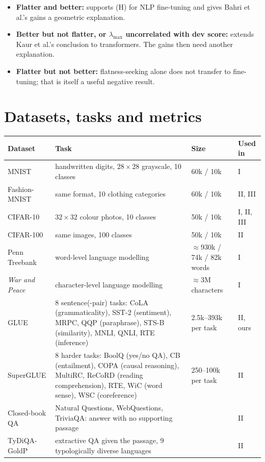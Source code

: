 \documentclass[11pt]{article}
\newcommand{\lmax}{\lambda_{\max}}
\theoremstyle{plain}
\begin{document}
\begin{itemize}
  \item \textbf{Flatter and better:} supports (H) for NLP fine-tuning and gives Bahri et al.'s gains a geometric explanation.
  \item \textbf{Better but not flatter, or $\lmax$ uncorrelated with dev score:} extends Kaur et al.'s conclusion to transformers. The gains then need another explanation.
  \item \textbf{Flatter but not better:} flatness-seeking alone does not transfer to fine-tuning; that is itself a useful negative result.
\end{itemize}

\appendix
\section{Datasets, tasks and metrics}
\label{app:data}

\begin{longtable}{@{}p{2.8cm}p{6.4cm}p{3.0cm}p{2.0cm}@{}}
\toprule
\textbf{Dataset} & \textbf{Task} & \textbf{Size} & \textbf{Used in} \\
\midrule
\endhead
MNIST & handwritten digits, $28{\times}28$ grayscale, 10 classes & 60k / 10k & I \\
Fashion-MNIST & same format, 10 clothing categories & 60k / 10k & II, III \\
CIFAR-10 & $32{\times}32$ colour photos, 10 classes & 50k / 10k & I, II, III \\
CIFAR-100 & same images, 100 classes & 50k / 10k & II \\
Penn Treebank & word-level language modelling & $\approx$930k / 74k / 82k words & I \\
\emph{War and Peace} & character-level language modelling & $\approx$3M characters & I \\
GLUE & 8 sentence(-pair) tasks: CoLA (grammaticality), SST-2 (sentiment), MRPC, QQP (paraphrase), STS-B (similarity), MNLI, QNLI, RTE (inference) & 2.5k--393k per task & II, ours \\
SuperGLUE & 8 harder tasks: BoolQ (yes/no QA), CB (entailment), COPA (causal reasoning), MultiRC, ReCoRD (reading comprehension), RTE, WiC (word sense), WSC (coreference) & 250--100k per task & II \\
Closed-book QA & Natural Questions, WebQuestions, TriviaQA: answer with no supporting passage & & II \\
TyDiQA-GoldP & extractive QA given the passage, 9 typologically diverse languages & & II \\
\bottomrule
\end{longtable}
\end{document}
